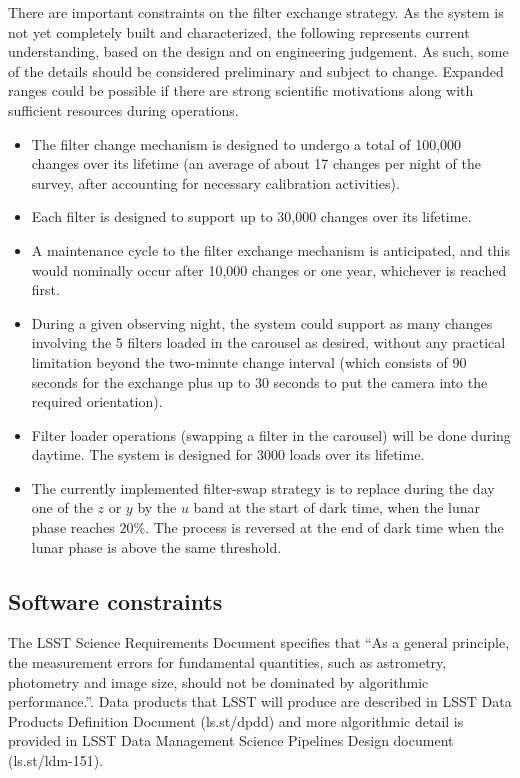 \documentclass[DM,lsstdraft,toc,usenatbib]{lsstdoc}
\begin{document}
There are important constraints on the filter exchange strategy. As the system is not yet completely 
built and characterized, the following represents current understanding, based on the design and on 
engineering judgement. As such, some of the details should be considered preliminary and subject 
to change. Expanded ranges could be possible if there are strong scientific motivations along with
sufficient resources during operations.
\begin{itemize}
\item The filter change mechanism is designed to undergo a total of 100,000 changes over its lifetime 
	(an average of about 17 changes per night of the survey, after accounting for necessary calibration activities). 
\item Each filter is designed to support up to 30,000 changes over its lifetime.
\item A maintenance cycle to the filter exchange mechanism is anticipated, and this would nominally occur after 10,000 changes or 
          one year, whichever is reached first. 
\item During a given observing night, the system could support as many changes involving the 5 filters 
          loaded in the carousel as desired, without any practical limitation beyond the two-minute change 
          interval (which consists of 90 seconds for the exchange plus up to 30 seconds to put the camera
          into the required orientation). 
\item Filter loader operations (swapping a filter in the carousel) will be done during daytime. The system 
          is designed for 3000 loads over its lifetime. 
\item The currently implemented filter-swap strategy is to replace during the day one of the $z$ or $y$ 
	by the $u$ band at the start of dark time, when the lunar phase reaches $20\%$. The 
	process is reversed at the end of dark time when the lunar phase is above the same threshold.
\end{itemize} 


\subsection{Software constraints} 

The LSST Science Requirements Document specifies that ``As a general principle, the measurement errors
for fundamental quantities, such as astrometry, photometry and image size, should not be dominated by 
algorithmic performance.''. Data products that LSST will produce are described in LSST Data Products
Definition Document (ls.st/dpdd) and more algorithmic detail is provided in LSST Data Management 
Science Pipelines Design document (ls.st/ldm-151). 
\end{document}
